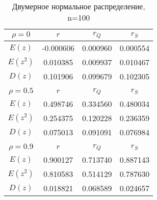 \begin{table}[H]
    \centering
    \begin{tabular}{c|c|c|c}
        $\rho=0$ & $r$ & $r_{Q}$ & $r_{S}$ \\
        \hline
        $E(z)$ & -0.000606 & 0.000960 & 0.000554 \\
        $E(z^2)$ & 0.010385 & 0.009937 & 0.010467 \\
        $D(z)$ & 0.101906 & 0.099679 & 0.102305 \\
        \multicolumn{4}{c}{} \\
        $\rho=0.5$ & $r$ & $r_{Q}$ & $r_{S}$ \\
        \hline
        $E(z)$ & 0.498746 & 0.334560 & 0.480034 \\
        $E(z^2)$ & 0.254375 & 0.120228 & 0.236359 \\
        $D(z)$ & 0.075013 & 0.091091 & 0.076984 \\
        \multicolumn{4}{c}{} \\
        $\rho=0.9$ & $r$ & $r_{Q}$ & $r_{S}$ \\
        \hline
        $E(z)$ & 0.900127 & 0.713740 & 0.887143 \\
        $E(z^2)$ & 0.810583 & 0.514129 & 0.787630 \\
        $D(z)$ & 0.018821 & 0.068589 & 0.024657 \\
    \end{tabular}
    \caption{Двумерное нормальное распределение, n=100}
    \label{tab:norm100}
\end{table}